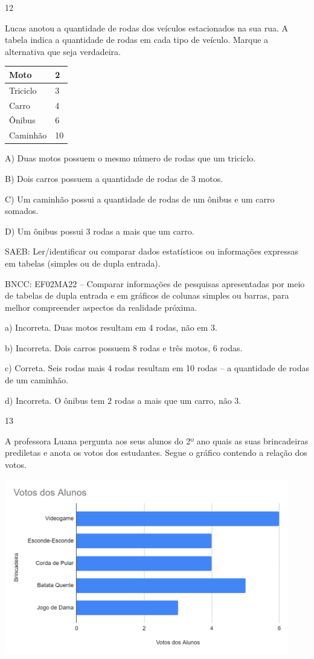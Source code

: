 \begin{escolha}
\begin{escolha}
{{{{{{{{\num{12}

Lucas anotou a quantidade de rodas dos veículos estacionados na sua rua.
A tabela indica a quantidade de rodas em cada tipo de veículo. Marque a
alternativa que seja verdadeira.

\begin{longtable}[]{@{}ll@{}}
\toprule
Moto & 2\tabularnewline
\midrule
\endhead
Triciclo & 3\tabularnewline
Carro & 4\tabularnewline
Ônibus & 6\tabularnewline
Caminhão & 10\tabularnewline
\bottomrule
\end{longtable}

A) Duas motos possuem o mesmo número de rodas que um triciclo.

B) Dois carros possuem a quantidade de rodas de 3 motos.

C) Um caminhão possui a quantidade de rodas de um ônibus e um carro
somados.

D) Um ônibus possui 3 rodas a mais que um carro.

SAEB: Ler/identificar ou comparar dados estatísticos ou
informações expressas em tabelas (simples ou de dupla entrada).

BNCC: EF02MA22 -- Comparar informações de pesquisas apresentadas por meio
de tabelas de dupla entrada e em gráficos de colunas simples ou barras,
para melhor compreender aspectos da realidade próxima.

a) Incorreta. Duas motos resultam em 4 rodas, não em 3.

b) Incorreta. Dois carros possuem 8 rodas e três motos, 6 rodas.

c) Correta. Seis rodas mais 4 rodas resultam em 10 rodas -- a quantidade
de rodas de um caminhão.

d) Incorreta. O ônibus tem 2 rodas a mais que um carro, não 3.

\num{13}

A professora Luana pergunta aos seus alunos do 2º ano quais as suas
brincadeiras prediletas e anota os votos dos estudantes. Segue o gráfico
contendo a relação dos votos.

\includegraphics[width=4.88542in,height=3.01579in]{media/image171.png}

}}}}}}}}
\end{escolha}
\end{escolha}
